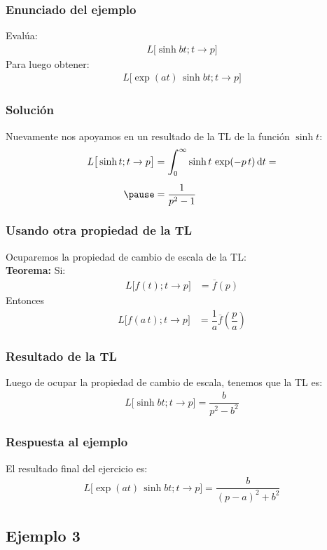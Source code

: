 \documentclass[12pt]{beamer}
\begin{document}
\begin{frame}
\frametitle{Enunciado del ejemplo}
Evalúa:
\pause
\begin{align*}
L \big[ \sinh bt; t \to p \big]
\end{align*}
\pause
Para luego obtener:
\pause
\begin{align*}
L \big[ \exp (a t) \, \sinh bt; t \to p \big]
\end{align*}    
\end{frame}
\begin{frame}
\frametitle{Solución}
Nuevamente nos apoyamos en un resultado de la TL de la función $\sinh t$:
\pause
\begin{eqnarray*}
\begin{aligned}
L \big[ \sinh t ; t \to p \big] &= \scaleint{6ex}_{\bs 0}^{\infty} \sinh t \, \exp(-p \, t) \dd{t} = \\[0.5em] \pause
&= \dfrac{1}{p^{2} - 1}
\end{aligned}
\end{eqnarray*}
\end{frame}
\begin{frame}
\frametitle{Usando otra propiedad de la TL}
Ocuparemos la propiedad de cambio de escala de la TL:
\\
\bigskip
\pause
\noindent \textbf{Teorema: } Si:
\begin{align*}
L \big[f(t); t \to p\big] &= \overline{f} (p)
\end{align*}
Entonces
\begin{align*}
L \big[f(a \, t); t \to p\big] &= \dfrac{1}{a}\overline{f} \left(\dfrac{p}{a}\right)
\end{align*}
\end{frame}
\begin{frame}
\frametitle{Resultado de la TL}
Luego de ocupar la propiedad de cambio de escala, tenemos que la TL es:
\pause
\begin{align*}
L \big[ \sinh b t ; t \to p \big] = \dfrac{b}{p^{2} - b^{2}}
\end{align*}
\end{frame}
\begin{frame}
\frametitle{Respuesta al ejemplo}
El resultado final del ejercicio es:
\pause
\begin{align*}
L \big[ \exp (a t) \, \sinh bt; t \to p \big] = \dfrac{b}{(p - a)^{2} + b^{2}}
\end{align*}
\end{frame}

\subsection{Ejemplo 3}
\end{document}
